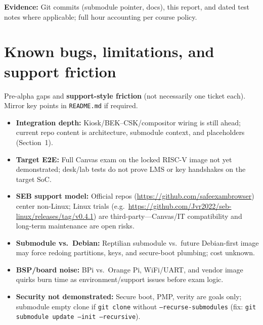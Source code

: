 \documentclass[10pt]{article}
\begin{document}
\noindent\textbf{Evidence:} Git commits (submodule pointer, docs), this report, and dated test notes where applicable; full hour accounting per course policy.

\section{Known bugs, limitations, and support friction}

Pre-alpha gaps and \textbf{support-style friction} (not necessarily one ticket each). Mirror key points in \texttt{README.md} if required.

\begin{itemize}\setlength{\itemsep}{0.12em}
  \item \textbf{Integration depth:} Kiosk/BEK--CSK/compositor wiring is still ahead; current repo content is architecture, submodule context, and placeholders (Section~1).
  \item \textbf{Target E2E:} Full Canvas exam on the locked RISC-V image not yet demonstrated; desk/lab tests do not prove LMS or key handshakes on the target SoC.
  \item \textbf{SEB support model:} Official repos (\url{https://github.com/safeexambrowser}) center non-Linux; Linux trials (e.g.\ \url{https://github.com/Jvr2022/seb-linux/releases/tag/v0.4.1}) are third-party---Canvas/IT compatibility and long-term maintenance are open risks.
  \item \textbf{Submodule vs.\ Debian:} Reptilian submodule vs.\ future Debian-first image may force redoing partitions, keys, and secure-boot plumbing; cost unknown.
  \item \textbf{BSP/board noise:} BPi vs.\ Orange Pi, WiFi/UART, and vendor image quirks burn time as environment/support issues before exam logic.
  \item \textbf{Security not demonstrated:} Secure boot, PMP, verity are goals only; submodule empty clone if \texttt{git clone} without \texttt{--recurse-submodules} (fix: \texttt{git submodule update --init --recursive}).
\end{itemize}
\end{document}
